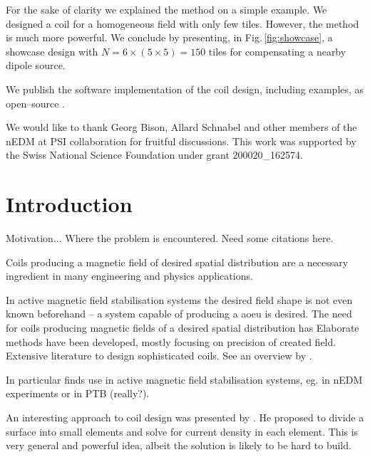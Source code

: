 For the sake of clarity we explained the method on a simple example. We designed a coil for a homogeneous field with only few tiles. However, the method is much more powerful. We conclude by presenting, in Fig.\,\ref{fig:showcase}, a showcase design with $N = 6 \times (5 \times 5) = 150$ tiles for compensating a nearby dipole source.

We publish the software implementation of the coil design, including examples, as open--source \cite{Coilsjlcode}.

We would like to thank Georg Bison, Allard Schnabel and other members of the nEDM at PSI collaboration for fruitful discussions. This work was supported by the Swiss National Science Foundation under grant 200020\_162574.











\section{Introduction}

Motivation... Where the problem is encountered. Need some citations here.

Coils producing a magnetic field of desired spatial distribution are a necessary ingredient in many engineering and physics applications.

In active magnetic field stabilisation systems the desired field shape is not even known beforehand -- a system capable of producing a aoeu is desired.
The need for coils producing magnetic fields of a desired spatial distribution has
Elaborate methods have been developed, mostly focusing on precision of created field.
Extensive literature to design sophisticated coils.
See an overview by \citeauthor{Turner1993} \citep{Turner1993}.

In particular finds use in active magnetic field stabilisation systems, eg. in nEDM experiments or in PTB (really?).

An interesting approach to coil design was presented by \citeauthor{Compton1982} \citep{Compton1982}. He proposed to divide a surface into small elements and solve for current density in each element. This is very general and powerful idea, albeit the solution is likely to be hard to build.

